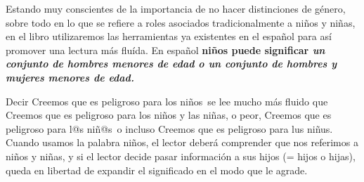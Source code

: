 

Estando muy conscientes de la importancia de no hacer distinciones de
g\'enero, sobre todo en lo que se refiere a roles asociados
tradicionalmente a ni\~nos y ni\~nas, en el libro utilizaremos las
herramientas ya existentes en el espa\~nol para as\'i promover una lectura
m\'as flu\'ida. En espa\~nol \bf{ni\~nos} puede significar \it{un conjunto de
hombres menores de edad} \bf{o} \it{un conjunto de hombres y mujeres menores de
edad}.

Decir \odq Creemos que es peligroso para los ni\~nos\cdq\ se lee mucho
m\'as fluido que \odq Creemos que es peligroso para los ni\~nos y las
ni\~nas\cdq, o peor, \odq Creemos que es peligroso para l@s ni\~n@s\cdq\
o incluso \odq Creemos que es peligroso para lus ni\~nus\cdq.  Cuando
usamos la palabra \odq ni\~nos\cdq, el lector deber\'a comprender que
nos referimos a \odq ni\~nos y ni\~nas\cdq, y si el lector decide pasar
informaci\'on a sus hijos (= hijos o hijas), queda en libertad de
expandir el significado en el modo que le agrade.

